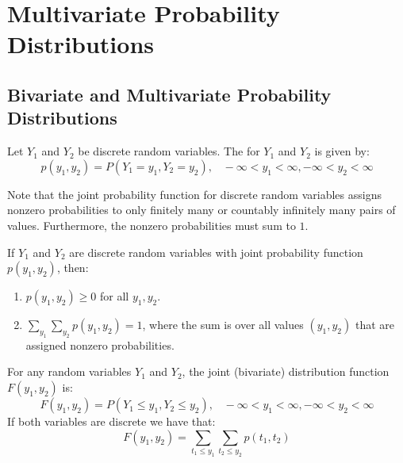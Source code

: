 \documentclass[12pt, a4paper, twoside, openright, titlepage]{book}
\begin{document}
\chapter{Multivariate Probability Distributions}

\section{\textsection Bivariate and Multivariate Probability Distributions}

\begin{defn}{}{}
    Let $Y_1$ and $Y_2$ be discrete random variables. The  for $Y_1$ and $Y_2$ is given by: \begin{equation*}
        p(y_1,y_2) = P(Y_1 = y_1, Y_2 = y_2), \;\;\;-\infty < y_1 < \infty, - \infty < y_2 < \infty
    \end{equation*}
\end{defn}

Note that the joint probability function for discrete random variables assigns nonzero probabilities to only finitely many or countably infinitely many pairs of values. Furthermore, the nonzero probabilities must sum to $1$.

\begin{thm}{}{}
    If $Y_1$ and $Y_2$ are discrete random variables with joint probability function $p(y_1,y_2)$, then: \begin{enumerate}
        \item $p(y_1,y_2) \geq 0$ for all $y_1,y_2$.
        \item $\sum_{y_1}\sum_{y_2}p(y_1,y_2) = 1$, where the sum is over all values $(y_1,y_2)$ that are assigned nonzero probabilities.
    \end{enumerate}
\end{thm}

\begin{defn}{}{}
    For any random variables $Y_1$ and $Y_2$, the joint (bivariate) distribution function $F(y_1,y_2)$ is: \begin{equation*}
        F(y_1,y_2) = P(Y_1 \leq y_1, Y_2 \leq y_2), \;\;\; -\infty < y_1 < \infty, -\infty < y_2 < \infty
    \end{equation*}
    If both variables are discrete we have that: \begin{equation*}
        F(y_1,y_2) = \sum\limits_{t_1\leq y_1}\sum\limits_{t_2 \leq y_2}p(t_1,t_2)
    \end{equation*}
\end{defn}
\end{document}

